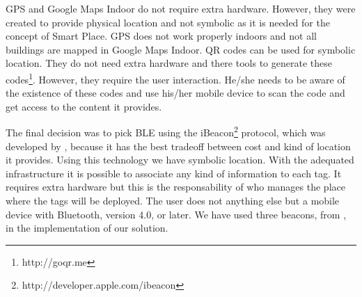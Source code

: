 \gls{GPS} and Google Maps Indoor do not require extra hardware. However, they were created to provide physical location and not symbolic as it is needed for the concept of Smart Place.
\gls{GPS} does not work properly indoors and not all buildings are mapped in Google Maps Indoor.
\gls{QR} codes can be used for symbolic location. They do not need extra hardware and there tools to generate these codes\footnote{http://goqr.me}.
However, they require the user interaction. He/she needs to be aware of the existence of these codes and use his/her mobile device to scan the code and get access to the content it provides.

The final decision was to pick \gls{BLE} using the iBeacon\footnote{http://developer.apple.com/ibeacon} protocol, which was developed by , because it has the best tradeoff between cost and kind of location it provides. Using this technology we have symbolic location. With the adequated infrastructure it is possible to associate any kind of information to each tag.
It requires extra hardware but this is the responsability of who manages the place where the tags will be deployed.
The user does not anything else but a mobile device with Bluetooth, version 4.0, or later.
We have used three beacons, from , in the implementation of our solution.
